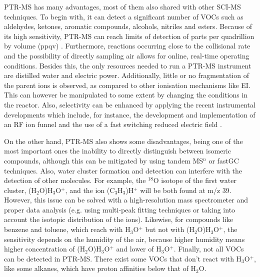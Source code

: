 PTR-MS has many advantages, most of them also shared with other SCI-MS techniques. To begin with, it can detect a significant number of  VOCs such as aldehydes, ketones, aromatic compounds, alcohols,  nitriles and esters.
Because of its high sensitivity, PTR-MS can reach limits of detection of parts per quadrillion by volume (\acrshort{ppqv}) \cite{ioniconlod}.
Furthermore, reactions occurring close to the collisional rate and the possibility of directly sampling air allows for online, real-time operating conditions. Besides this, the only resources needed to run a PTR-MS instrument are distilled water and electric power.
Additionally, little or no fragmentation of the parent ions is observed, as compared to other ionisation mechanisms like EI. This  can however be manipulated to some extent by changing the conditions in the reactor. Also, selectivity can be enhanced by applying the recent instrumental developments which include, for instance, the development and implementation of an RF ion funnel \cite{barber2012increased,RF_TNT} and the use of a fast switching reduced electric field \cite{doi:10.1021/acs.analchem.7b05211}.

On the other hand, PTR-MS also shows some disadvantages, being one of the most important ones the inability to directly distinguish between isomeric compounds, although this can be mitigated by using tandem MS$^n$ or fastGC techniques. %
Also, water cluster formation and detection can interfere with the detection of other molecules. For example, the $^{18}$O isotope of the first water cluster, (H$_2$O)H$_3$O$^+$, and the ion (C$_3$H$_3$)H$^+$ will  be both found at m/z 39. However, this issue can be solved with a high-resolution mass spectrometer and proper data analysis (e.g. using multi-peak fitting techniques or taking into account the isotopic distribution of the ions). Likewise, for compounds like benzene and toluene, which reach with H$_3$O$^+$ but not with (H$_2$O)H$_3$O$^+$, the sensitivity depends on the humidity of the air, because higher humidity means higher concentration of (H$_2$O)H$_3$O$^+$ and lower of H$_3$O$^+$. Finally, not all VOCs can be detected in PTR-MS. There exist some VOCs that don’t react with H$_3$O$^+$, like some alkanes, which have proton affinities below that of H$_2$O.













